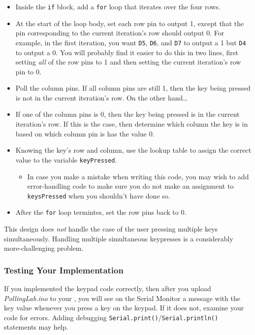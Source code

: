     \begin{itemize}
    \item Inside the \lstinline{if} block, add a \lstinline{for} loop that
        iterates over the four rows.
    \item At the start of the loop body, set each row pin to output 1, except
        that the pin corresponding to the current iteration's row should output
        0. For example, in the first iteration, you want \texttt{D5},
        \texttt{D6}, and \texttt{D7} to output a 1 but \texttt{D4} to output a
        0. You will probably find it easier to do this in two lines, first
        setting \textit{all} of the row pins to 1 and then setting the current
        iteration's row pin to 0.
    \item Poll the column pins. If all column pins are still 1, then the key
        being pressed is not in the current iteration's row. On the other
        hand\dots
    \item If one of the column pins is 0, then the key being pressed is in the
        current iteration's row. If this is the case, then determine which
        column the key is in based on which column pin is has the value 0.
    \item Knowing the key's row and column, use the lookup table to assign the correct value to the variable \lstinline{keyPressed}.
        \begin{itemize}
        \item In case you make a mistake when writing this code, you may wish
            to add error-handling code to make sure you do not make an
            assignment to \lstinline{keysPressed} when you shouldn't have done
            so.
        \end{itemize}
    \item After the \lstinline{for} loop termintes, set the row pins back to 0.
    \end{itemize}

This design does \textit{not} handle the case of the user pressing multiple
keys simultaneously. Handling multiple simultaneous keypresses is a
considerably more-challenging problem.

\subsubsection{Testing Your Implementation}

If you implemented the keypad code correctly, then after you upload
\textit{PollingLab.ino} to your \nano, you will see on the Serial Monitor a
message with the key value whenever you press a key on the keypad. If it does
not, examine your code for errors. Adding debugging
\lstinline{Serial.print()}/\lstinline{Serial.println()} statements may help.

